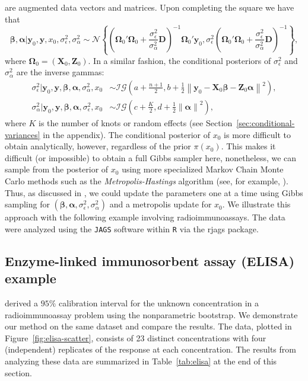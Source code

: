 \documentclass[cmfont,usenames,dvipsnames,leqno]{afit-etd}\usepackage[]{graphicx}\usepackage[]{color}
\newcommand{\code}[1]{\texttt{\small{#1}}}
\newcommand{\pkg}[1]{\textsf{\small{#1}}}
\newcommand{\norm}[1]{\left\|#1\right\|}
\newcommand{\mc}[1]{\ensuremath{\mathcal{#1}}}
\begin{document}
are augmented data vectors and matrices. Upon completing the square we have that
\begin{equation*}
  \bm{\beta}, \bm{\alpha}|\bm{y}_0, \bm{y}, x_0, \sigma_\epsilon^2, \sigma_\alpha^2 \sim \mc{N}\left\{ \left(\bm{\Omega}_0'\bm{\Omega}_0 + \frac{\sigma_\epsilon^2}{\sigma_\alpha^2}\bm{D}\right)^{-1}\bm{\Omega}_0'\bm{y}_0, \sigma_\epsilon^2\left(\bm{\Omega}_0'\bm{\Omega}_0 + \frac{\sigma_\epsilon^2}{\sigma_\alpha^2}\bm{D}\right)^{-1} \right\},
\end{equation*}
where $\bm{\Omega}_0 = (\bm{X}_0, \bm{Z}_0)$. In a similar fashion, the conditional posteriors of $\sigma_\epsilon^2$ and $\sigma_\alpha^2$ are the inverse gammas:
\begin{align*}
  \sigma_\epsilon^2|\bm{y}_0, \bm{y}, \bm{\beta}, \bm{\alpha}, \sigma_\alpha^2, x_0 &\sim \mc{IG}\left( a + \frac{n+1}{2}, b + \frac{1}{2}\norm{\bm{y}_0 - \bm{X}_0\bm{\beta} - \bm{Z}_0\bm{\alpha}}^2 \right), \\
    \sigma_\alpha^2|\bm{y}_0, \bm{y}, \bm{\beta}, \bm{\alpha}, \sigma_\epsilon^2, x_0 &\sim \mc{IG}\left( c + \frac{K}{2}, d + \frac{1}{2}\norm{\bm{\alpha}}^2 \right),
\end{align*}
where $K$ is the number of knots or random effects (see Section~\ref{sec:conditional-variances} in the appendix). The conditional posterior of $x_0$ is more difficult to obtain analytically, however, regardless of the prior $\pi(x_0)$. This makes it difficult (or impossible) to obtain a full Gibbs sampler here, nonetheless, we can sample from the posterior of $x_0$ using more specialized Markov Chain Monte Carlo methods such as the \textit{Metropolis-Hastings} algorithm (see, for example, \citet[chap. 7]{robert_monte_2004}). Thus, as discussed in \citep[pg. 292]{gelman_bayesian_2003}, we could update the parameters one at a time using Gibbs sampling for $\left(\bm{\beta}, \bm{\alpha}, \sigma_\epsilon^2, \sigma_\alpha^2\right)$ and a metropolis update for $x_0$. We illustrate this approach with the following example involving radioimmunoassays. The data were analyzed using the \code{JAGS} software within \code{R} via the \pkg{rjags} package.

\subsection{Enzyme-linked immunosorbent assay (ELISA) example}
\citet{ori_constructing_1995} derived a $95\%$ calibration interval for the unknown concentration in a radioimmunoassay problem using the nonparametric bootstrap. We demonstrate our method on the same dataset and compare the results. The data, plotted in Figure~\ref{fig:elisa-scatter}, consists of 23 distinct concentrations with four (independent) replicates of the response at each concentration. The results from analyzing these data are summarized in Table~\ref{tab:elisa} at the end of this section.
\end{document}
